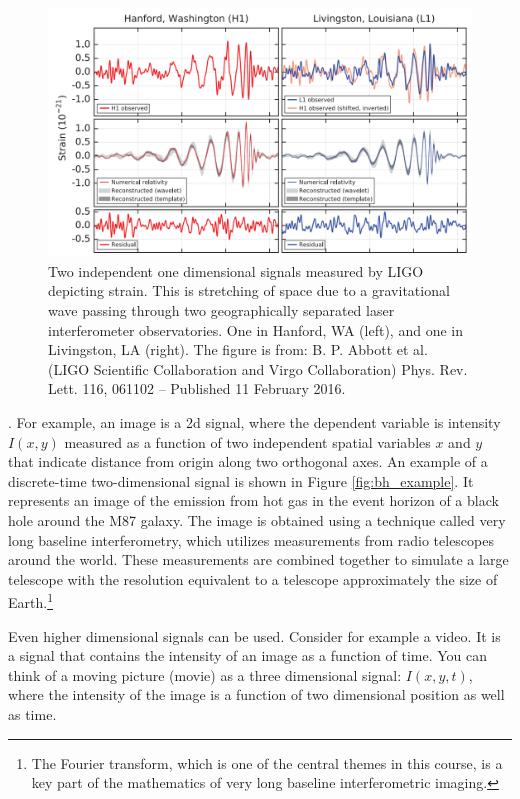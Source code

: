 \begin{figure}
\begin{center}
\includegraphics[width=\textwidth]{ch04/figures/dc_fg.png}
\end{center}
\caption{Two independent one dimensional signals measured by LIGO depicting strain. This is stretching of space due to a gravitational wave passing through two geographically separated laser interferometer observatories. One in Hanford, WA (left), and one in Livingston, LA (right). The figure is from: B. P. Abbott et al. (LIGO Scientific Collaboration and Virgo Collaboration) Phys. Rev. Lett. 116, 061102 – Published 11
February 2016.}
\label{fig:ligo_meas}
\end{figure}

. For example, an image is a 2d signal, where the dependent variable is intensity $I(x,y)$ measured as a function of two independent spatial variables $x$ and $y$ that indicate distance from origin along two orthogonal axes.  An example of a discrete-time two-dimensional signal is shown in Figure \ref{fig:bh_example}. It represents an image of the emission from hot gas in the event horizon of a black hole around the M87 galaxy. The image is obtained using a technique called very long baseline interferometry, which utilizes measurements from radio telescopes around the world. These measurements are combined together to simulate a large telescope with the resolution equivalent to a telescope approximately the size of Earth.\footnote{The Fourier transform, which is one of the central themes in this course, is a key part of the mathematics of very long baseline interferometric imaging.}

Even higher dimensional signals can be used. Consider for example a video. It is a signal that contains the intensity of an image as a function of time. You can think of a moving picture (movie) as a three dimensional signal: $I(x,y,t)$, where the intensity of the image is a function of two dimensional position as well as time.

